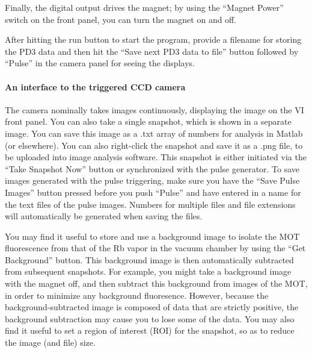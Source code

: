 \documentclass{../lab}
\begin{document}
Finally, the digital output drives the magnet; by using the ``Magnet Power'' switch on the front panel, you can turn the magnet on and off.

After hitting the run button to start the program, provide a filename for storing the PD3 data and then hit the ``Save next PD3 data to file'' button followed by ``Pulse'' in the camera panel for seeing the displays.

\paragraph{An interface to the triggered CCD camera}
\label{par:InterfaceToTriggeredCCDCamera}

The camera nominally takes images continuously, displaying the image on the VI front panel. You can also take a single snapshot, which is shown in a separate image. You can save this image as a .txt array of numbers for analysis in Matlab (or elsewhere). You can also right-click the snapshot and save it as a .png file, to be uploaded into image analysis software. This snapshot is either initiated via the ``Take Snapshot Now'' button or synchronized with the pulse generator. To save images generated with the pulse triggering, make sure you have the ``Save Pulse Images'' button pressed before you push ``Pulse'' and have entered in a name for the text files of the pulse images. Numbers for multiple files and file extensions will automatically be generated when saving the files.

You may find it useful to store and use a background image to isolate the MOT fluorescence from that of the Rb vapor in the vacuum chamber by using the ``Get Background'' button. This background image is then automatically subtracted from subsequent snapshots. For example, you might take a background image with the magnet off, and then subtract this background from images of the MOT, in order to minimize any background fluoresence. However, because the background-subtracted image is composed of data that are strictly positive, the background subtraction may cause you to lose some of the data. You may also find it useful to set a region of interest (ROI) for the snapshot, so as to reduce the image (and file) size.
\end{document}
